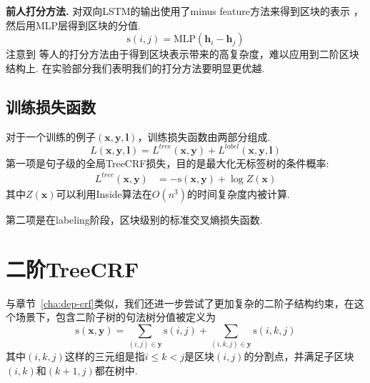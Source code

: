 \noindent\textbf{前人打分方法.}
\citet{stern-etal-2017-minimal}对双向LSTM的输出使用了minus feature方法来得到区块的表示 \citep{wang-chang-2016-graph,cross-huang-2016-span}，然后用MLP层得到区块的分值.
\begin{equation} \label{eq:minus-score}
	\mathrm{s}(i,j)=\mathrm{MLP}(\mathbf{h}_{i}-\mathbf{h}_{j})
\end{equation}
注意到 \citet{stern-etal-2017-minimal}等人的打分方法由于得到区块表示带来的高复杂度，难以应用到二阶区块结构上.
在实验部分我们表明我们的打分方法要明显更优越.

\subsection{训练损失函数}

对于一个训练的例子$(\boldsymbol{x},\boldsymbol{y},\boldsymbol{l})$，训练损失函数由两部分组成.
\begin{equation} \label{eq:final-loss}
	\mathit{L}(\boldsymbol{x}, \boldsymbol{y}, \boldsymbol{l}) = \mathit{L}^{tree}(\boldsymbol{x}, \boldsymbol{y}) + \mathit{L}^{label}(\boldsymbol{x}, \boldsymbol{y}, \boldsymbol{l})
\end{equation}
第一项是句子级的全局TreeCRF损失，目的是最大化无标签树的条件概率:
\begin{equation}\label{eq:bracket-loss}
	\begin{split}
		\mathit{L}^{tree}(\boldsymbol{x},\boldsymbol{y})
		&= -\mathrm{s}(\boldsymbol{x}, \boldsymbol{y}) + \log Z(\boldsymbol{x})
	\end{split}
\end{equation}
其中$Z(\boldsymbol{x})$可以利用Inside算法在$O(n^3)$的时间复杂度内被计算.

第二项是在labeling阶段，区块级别的标准交叉熵损失函数.

\section{二阶TreeCRF}
\label{sec:con-2o-treecrf}

与章节~\ref{cha:dep-crf}类似，我们还进一步尝试了更加复杂的二阶子结构约束，在这个场景下，包含二阶子树的句法树分值被定义为
\begin{equation} \label{eq:2ostree-score}
	\mathrm{s}(\boldsymbol{x},\boldsymbol{y}) = \sum\limits_{(i,j)\in \boldsymbol{y}}\mathrm{s}(i,j)+\sum\limits_{(i,k,j)\in \boldsymbol{y}}\mathrm{s}(i,k,j)
\end{equation}
其中$(i,k,j)$这样的三元组是指$i \leq k < j$是区块$(i,j)$的分割点，并满足子区块$(i,k)$和$(k+1,j)$都在树中.

